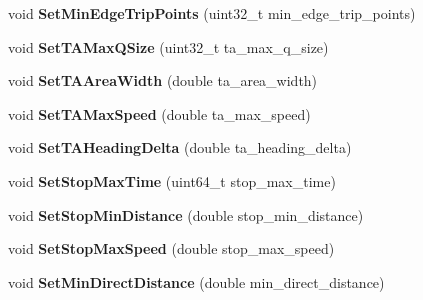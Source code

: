 \begin{DoxyCompactItemize}
\item 
void {\bfseries Set\+Min\+Edge\+Trip\+Points} (uint32\+\_\+t min\+\_\+edge\+\_\+trip\+\_\+points)\hypertarget{classconfig_1_1Config_a563c21df74f756b65d11468c8c9e8fe9}{}\label{classconfig_1_1Config_a563c21df74f756b65d11468c8c9e8fe9}

\item 
void {\bfseries Set\+T\+A\+Max\+Q\+Size} (uint32\+\_\+t ta\+\_\+max\+\_\+q\+\_\+size)\hypertarget{classconfig_1_1Config_a66277db2e4e28eb492a069a991c93bcd}{}\label{classconfig_1_1Config_a66277db2e4e28eb492a069a991c93bcd}

\item 
void {\bfseries Set\+T\+A\+Area\+Width} (double ta\+\_\+area\+\_\+width)\hypertarget{classconfig_1_1Config_ae66ffdfff9c376e47c6154c337fd4b39}{}\label{classconfig_1_1Config_ae66ffdfff9c376e47c6154c337fd4b39}

\item 
void {\bfseries Set\+T\+A\+Max\+Speed} (double ta\+\_\+max\+\_\+speed)\hypertarget{classconfig_1_1Config_a07ce41929fde7cb8ff7968861bd9959a}{}\label{classconfig_1_1Config_a07ce41929fde7cb8ff7968861bd9959a}

\item 
void {\bfseries Set\+T\+A\+Heading\+Delta} (double ta\+\_\+heading\+\_\+delta)\hypertarget{classconfig_1_1Config_a36346f9b665c8d7746a3778544e75826}{}\label{classconfig_1_1Config_a36346f9b665c8d7746a3778544e75826}

\item 
void {\bfseries Set\+Stop\+Max\+Time} (uint64\+\_\+t stop\+\_\+max\+\_\+time)\hypertarget{classconfig_1_1Config_a2c777d0133e1c75fe3647ca07d97d060}{}\label{classconfig_1_1Config_a2c777d0133e1c75fe3647ca07d97d060}

\item 
void {\bfseries Set\+Stop\+Min\+Distance} (double stop\+\_\+min\+\_\+distance)\hypertarget{classconfig_1_1Config_a46704ef25431489adbcf27822c343eba}{}\label{classconfig_1_1Config_a46704ef25431489adbcf27822c343eba}

\item 
void {\bfseries Set\+Stop\+Max\+Speed} (double stop\+\_\+max\+\_\+speed)\hypertarget{classconfig_1_1Config_af8393b0875b2d8b0a00ec6bab232890c}{}\label{classconfig_1_1Config_af8393b0875b2d8b0a00ec6bab232890c}

\item 
void {\bfseries Set\+Min\+Direct\+Distance} (double min\+\_\+direct\+\_\+distance)\hypertarget{classconfig_1_1Config_aa8de083b2b59268969b828e6c14fced7}{}\label{classconfig_1_1Config_aa8de083b2b59268969b828e6c14fced7}


\end{DoxyCompactItemize}
